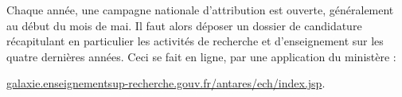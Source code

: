 

Chaque ann\'ee, une campagne nationale d'attribution est ouverte, g\'en\'eralement au d\'ebut du mois de mai. Il faut alors
d\'eposer un dossier de candidature r\'ecapitulant en particulier
les activit\'es  de recherche et d'enseignement sur les quatre derni\`eres ann\'ees. Ceci se fait en ligne, par une application du minist\`ere :

 \url{galaxie.enseignementsup-recherche.gouv.fr/antares/ech/index.jsp}. 
 

%


